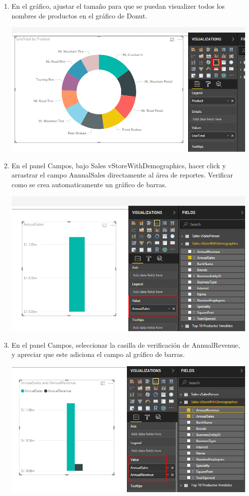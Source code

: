 \begin{itemize}
\begin{enumerate}
\item En el gráfico, ajustar el tamaño para que se puedan visualizer todos los nombres de productos en el gráfico de Donut.
\begin{center}
\includegraphics[scale=0.55]{./Imagenes/14.png}
\end{center}

\item En el panel Campos, bajo Sales vStoreWithDemographics, hacer click y arrastrar el campo AnnualSales directamente al área de reportes. Verificar como se crea automaticamente un gráfico de barras.
\begin{center}
\includegraphics[scale=0.55]{./Imagenes/16.png}
\end{center}

\item En el panel Campos, seleccionar la casilla de verificación de AnnualRevenue, y apreciar que este adiciona el campo al gráfico de barras.
\begin{center}
\includegraphics[scale=0.55]{./Imagenes/17.png}
\end{center}


\end{enumerate}
\end{itemize}
